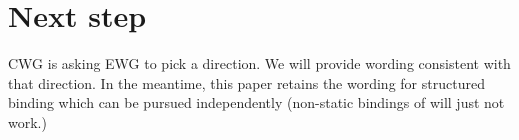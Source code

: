 \documentclass{wg21}
\begin{document}
\section{Next step}

CWG is asking EWG to pick a direction. We will provide wording consistent with that direction.
In the meantime, this paper retains the wording for  structured binding which can be pursued independently (non-static bindings of  will just not
work.)

%
%
%
%
%
%
%
%
%
%
\end{document}
